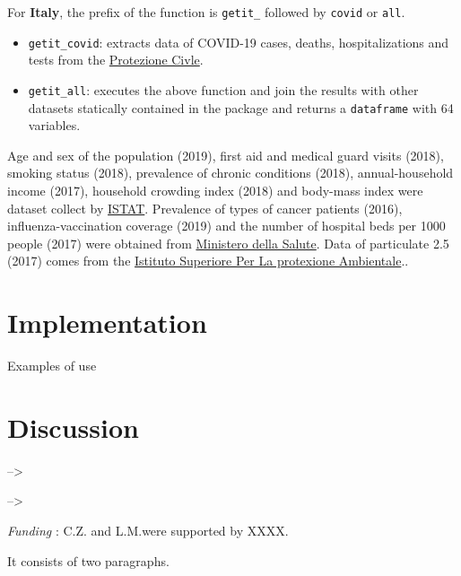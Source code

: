 \documentclass[12pt,halfline,a4paper,]{ouparticle}
\providecommand{\tightlist}{%
  \setlength{\itemsep}{0pt}\setlength{\parskip}{0pt}}
\begin{document}
For \textbf{Italy}, the prefix of the function is \texttt{getit\_}
followed by \texttt{covid} or \texttt{all}.

\begin{itemize}
\tightlist
\item
  \texttt{getit\_covid}: extracts data of COVID-19 cases, deaths,
  hospitalizations and tests from the
  \href{\%22https://raw.githubusercontent.com/pcm-dpc/COVID-19/master/dati-regioni/dpc-covid19-ita-regioni.csv\%22}{Protezione
  Civle}.
\item
  \texttt{getit\_all}: executes the above function and join the results
  with other datasets statically contained in the package and returns a
  \texttt{dataframe} with 64 variables.
\end{itemize}

Age and sex of the population (2019), first aid and medical guard visits
(2018), smoking status (2018), prevalence of chronic conditions (2018),
annual-household income (2017), household crowding index (2018) and
body-mass index were dataset collect by
\href{http://dati.istat.it/?lang=en}{ISTAT}. Prevalence of types of
cancer patients (2016), influenza-vaccination coverage (2019) and the
number of hospital beds per 1000 people (2017) were obtained from
\href{http://www.dati.salute.gov.it/}{Ministero della Salute}. Data of
particulate 2.5 (2017) comes from the
\href{https://annuario.isprambiente.it/pon/basic/14}{Istituto Superiore
Per La protexione Ambientale}..

\hypertarget{implementation}{%
\section{Implementation}\label{implementation}}

Examples of use

\hypertarget{discussion}{%
\section{Discussion}\label{discussion}}

--\textgreater{}

--\textgreater{}


\begin{notes}[Acknowledgements]
\emph{Funding} : C.Z. and L.M.were supported by XXXX.

It consists of two paragraphs.
\end{notes}


\renewcommand\refname{References}


\end{document}
